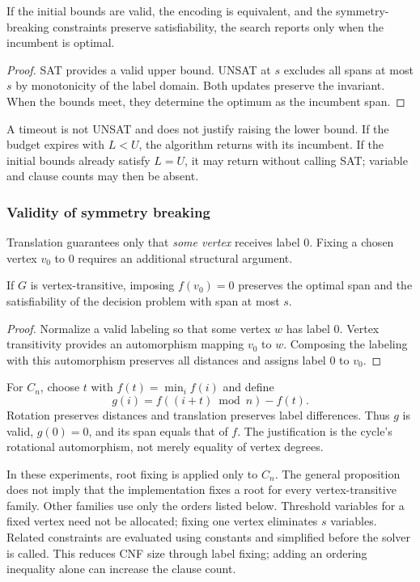 \begin{proposition}
If the initial bounds are valid, the encoding is equivalent, and the
symmetry-breaking constraints preserve satisfiability, the search reports
\OPT{} only when the incumbent is optimal.
\end{proposition}
\begin{proof}
SAT provides a valid upper bound. UNSAT at $s$ excludes all spans at most
$s$ by monotonicity of the label domain. Both updates preserve the invariant.
When the bounds meet, they determine the optimum as the incumbent span.
\end{proof}
A timeout is not UNSAT and does not justify raising the lower bound.
If the budget expires with $L<U$, the algorithm returns \FEAS{} with its
incumbent. If the initial bounds already satisfy $L=U$, it may return
\OPT{} without calling SAT; variable and clause counts may then be absent.

\subsubsection{Validity of symmetry breaking}
Translation guarantees only that \emph{some vertex} receives label 0.
Fixing a chosen vertex $v_0$ to 0 requires an additional structural argument.
\begin{proposition}
If $G$ is vertex-transitive, imposing $f(v_0)=0$ preserves the optimal span
and the satisfiability of the decision problem with span at most $s$.
\end{proposition}
\begin{proof}
Normalize a valid labeling so that some vertex $w$ has label 0.
Vertex transitivity provides an automorphism mapping $v_0$ to $w$.
Composing the labeling with this automorphism preserves all distances
and assigns label 0 to $v_0$.
\end{proof}

For $C_n$, choose $t$ with $f(t)=\min_i f(i)$ and define
\[
 g(i)=f((i+t)\bmod n)-f(t).
\]
Rotation preserves distances and translation preserves label differences.
Thus $g$ is valid, $g(0)=0$, and its span equals that of $f$. The justification
is the cycle's rotational automorphism, not merely equality of vertex degrees.

In these experiments, root fixing is applied only to $C_n$. The general
proposition does not imply that the implementation fixes a root for every
vertex-transitive family. Other families use only the orders listed below.
Threshold variables for a fixed vertex need not be allocated; fixing one
vertex eliminates $s$ variables. Related constraints are evaluated using
constants and simplified before the solver is called. This reduces CNF
size through label fixing; adding an ordering inequality alone can increase
the clause count.

